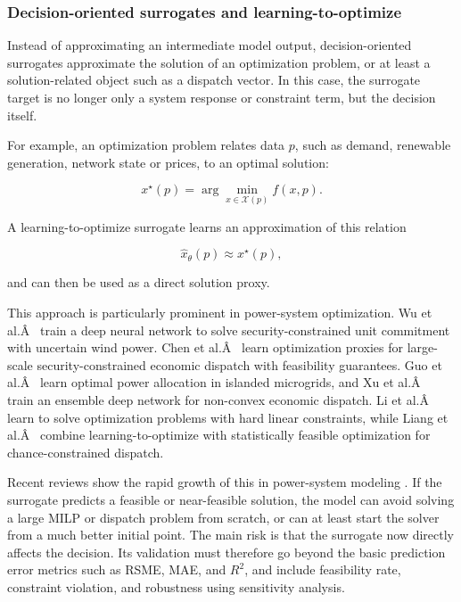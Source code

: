 \subsubsection{Decision-oriented surrogates and learning-to-optimize}
\label{sec:tax:l2o}

Instead of approximating an intermediate model output, decision-oriented
surrogates approximate the solution of an optimization problem, or at
least a solution-related object such as a dispatch vector. In this case,
the surrogate target is no longer only a system response or constraint
term, but the decision itself.

For example, an optimization problem relates data $p$, such as demand,
renewable generation, network state or prices, to an optimal solution:

$$\begin{equation}
 x^{\star}(p) = \arg\min_{x \in \mathcal{X}(p)} f(x,p).
\end{equation}$$

A learning-to-optimize surrogate learns an approximation of this
relation

$$\begin{equation}
 \hat{x}_{\theta}(p) \approx x^{\star}(p),
\end{equation}$$

and can then be used as a direct solution proxy.

This approach is particularly prominent in power-system optimization. Wu
et al.Â~\cite{Wu2022231} train a deep neural network to solve
security-constrained unit commitment with uncertain wind power. Chen et
al.Â~\cite{Chen2022,Chen20244723} learn optimization proxies for
large-scale security-constrained economic dispatch with feasibility
guarantees. Guo et al.Â~\cite{Guo20222057} learn optimal power allocation in
islanded microgrids, and Xu et al.Â~\cite{Xu20223066} train an ensemble deep
network for non-convex economic dispatch. Li et al.Â~\cite{Li202359995} learn
to solve optimization problems with hard linear constraints, while Liang
et al.Â~\cite{Liang20246508} combine learning-to-optimize with statistically
feasible optimization for chance-constrained dispatch.

Recent reviews show the rapid growth of this in power-system modeling
\cite{Khaloie2025,Lim2025,Ruan2021221}. If the surrogate predicts a
feasible or near-feasible solution, the model can avoid solving a large
MILP or dispatch problem from scratch, or can at least start the solver
from a much better initial point. The main risk is that the surrogate
now directly affects the decision. Its validation must therefore go
beyond the basic prediction error metrics such as RSME, MAE, and $R^2$,
and include feasibility rate, constraint violation, and robustness using
sensitivity analysis.
